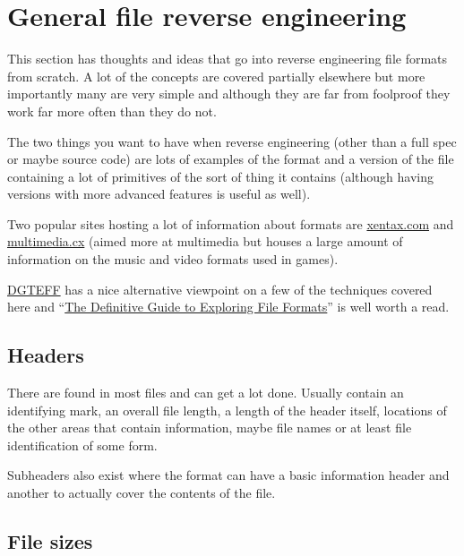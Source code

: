 \documentclass[
]{book}
\begin{document}
\hypertarget{general-file-reverse-engineering}{%
\chapter{General file reverse engineering}\label{general-file-reverse-engineering}}

This section has thoughts and ideas that go into reverse engineering file formats from scratch. A lot of the concepts are covered partially elsewhere but more importantly many are very simple and although they are far from foolproof they work far more often than they do not.

The two things you want to have when reverse engineering (other than a full spec or maybe source code) are lots of examples of the format and a version of the file containing a lot of primitives of the sort of thing it contains (although having versions with more advanced features is useful as well).

Two popular sites hosting a lot of information about formats are \href{http://wiki.xentax.com/index.php/Game_File_Format_Central}{xentax.com} and \href{http://wiki.multimedia.cx/index.php?title=Main_Page}{multimedia.cx} (aimed more at multimedia but houses a large amount of information on the music and video formats used in games).

\href{http://wiki.xentax.com/index.php?title=DGTEFF}{DGTEFF} has a nice alternative viewpoint on a few of the techniques covered here and ``\href{http://www.romhacking.net/docs/464/}{The Definitive Guide to Exploring File Formats}'' is well worth a read.

\hypertarget{headers}{%
\section{Headers}\label{headers}}

There are found in most files and can get a lot done. Usually contain an identifying mark, an overall file length, a length of the header itself, locations of the other areas that contain information, maybe file names or at least file identification of some form.

Subheaders also exist where the format can have a basic information header and another to actually cover the contents of the file.

\hypertarget{file-sizes}{%
\section{File sizes}\label{file-sizes}}
\end{document}
